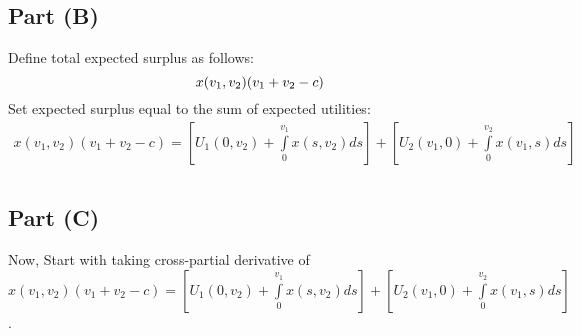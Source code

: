 \documentclass[10pt,a4paper]{article}
\begin{document}
  \subsection*{Part (B)}
    Define total expected surplus as follows:
    \begin{equation}
      x(v_1,v_2)(v_1+v_2-c) \\
    \end{equation}
    Set expected surplus equal to the sum of expected utilities:
    \begin{gather*}
      x(v_1,v_2)(v_1+v_2-c) = [U_1(0,v_2) + \int\limits_0^{v_1}x(s,v_2)ds] + [U_2(v_1,0) + \int\limits_0^{v_2}x(v_1,s)ds] \\
    \end{gather*}
  \subsection*{Part (C)}
    Now, Start with taking cross-partial derivative of $x(v_1,v_2)(v_1+v_2-c) = [U_1(0,v_2) + \int\limits_0^{v_1}x(s,v_2)ds] + [U_2(v_1,0) + \int\limits_0^{v_2}x(v_1,s)ds]$.
\end{document}
